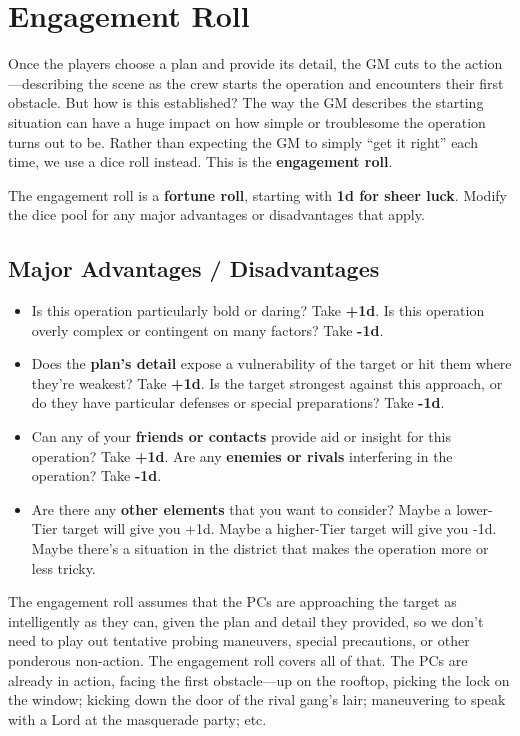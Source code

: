 \documentclass[11pt,oneside]{book}
\begin{document}
\section{Engagement Roll}

Once the players choose a plan and provide its detail, the GM cuts to the action---describing the scene as the crew starts the operation and encounters their first obstacle. But how is this established? The way the GM describes the starting situation can have a huge impact on how simple or troublesome the operation turns out to be. Rather than expecting the GM to simply “get it right” each time, we use a dice roll instead. This is the \textbf{engagement roll}.

The engagement roll is a \textbf{fortune roll}, starting with \textbf{1d for sheer luck}. Modify the dice pool for any major advantages or disadvantages that apply.

\subsection{Major Advantages / Disadvantages}

\begin{itemize}
	\item Is this operation particularly bold or daring? Take \textbf{+1d}. Is this operation overly complex or contingent on many factors? Take \textbf{-1d}.
	\item Does the \textbf{plan’s detail} expose a vulnerability of the target or hit them where they’re weakest? Take \textbf{+1d}. Is the target strongest against this approach, or do they have particular defenses or special preparations? Take \textbf{-1d}.
	\item Can any of your \textbf{friends or contacts }provide aid or insight for this operation? Take \textbf{+1d}. Are any \textbf{enemies or rivals} interfering in the operation? Take \textbf{-1d}.
	\item Are there any \textbf{other elements} that you want to consider? Maybe a lower-Tier target will give you +1d.  Maybe a higher-Tier target will give you -1d. Maybe there’s a situation in the district that makes the operation more or less tricky.
\end{itemize}

The engagement roll assumes that the PCs are approaching the target as intelligently as they can, given the plan and detail they provided, so we don’t need to play out tentative probing maneuvers, special precautions, or other ponderous non-action. The engagement roll covers all of that. The PCs are already in action, facing the first obstacle---up on the rooftop, picking the lock on the window; kicking down the door of the rival gang’s lair; maneuvering to speak with a Lord at the masquerade party; etc.
\end{document}
